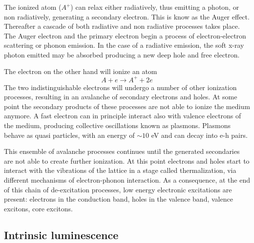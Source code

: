 The ionized atom ($A^{+}$) can relax either radiatively, thus emitting a photon, or non radiatively, generating a secondary electron. This is know as the Auger effect. Thereafter a cascade of both radiative and non radiative processes takes place.
The Auger electron and the primary electron begin a process of electron-electron scattering or phonon emission. In the case of a radiative emission, the soft x-ray photon emitted may be absorbed producing a new deep hole and free electron. 

The electron on the other hand will ionize an atom
\begin{equation}
A + e \rightarrow A^{+} + 2e
\end{equation}
The two indistinguishable electrons will undergo a number of other ionization processes, resulting in an avalanche of secondary electrons and holes. At some point the secondary products of these processes are not able to ionize the medium anymore.
A fast electron can in principle interact also with valence electrons of the medium, producing collective oscillations known as plasmons. Plasmons behave as quasi particles, with an energy of $\sim 10$ eV and can decay into e-h pairs.

This ensemble of avalanche processes continues until the generated secondaries are not able to create further ionization. At this point electrons and holes start to interact with the vibrations of the lattice in a stage called thermalization, via different mechanisms of electron-phonon interaction. 
 As a consequence, at the end of this chain of de-excitation processes, low energy electronic excitations are present: electrons in the conduction band, holes in the valence band, valence excitons, core excitons.
 
\subsection{Intrinsic luminescence}

